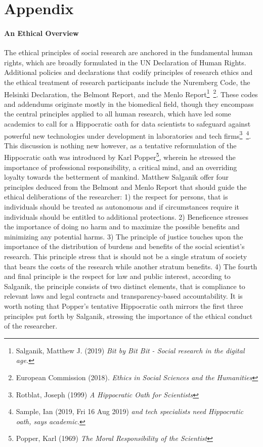 \documentclass[12pt,a4paper]{article}
\begin{document}
\section{Appendix}
\paragraph{An Ethical Overview \newline}
The ethical principles of social research are anchored in the fundamental human rights, which are broadly formulated in the UN Declaration of Human Rights. Additional policies and declarations that codify principles of research ethics and the ethical treatment of research participants include the Nuremberg Code, the Helsinki Declaration, the Belmont Report, and the Menlo Report\footnote{Salganik, Matthew J. (2019) \textit{Bit by Bit Bit - Social research in the digital age.}}\, \footnote{European Commission (2018). \textit{Ethics in Social Sciences and the Humanities}}. These codes and addendums originate mostly in the biomedical field, though they encompass the central principles applied to all human research, which have led some academics to call for a Hippocratic oath for data scientists to safeguard against powerful new technologies under development in laboratories and tech firms\footnote{Rotblat, Joseph (1999) \textit{A Hippocratic Oath for Scientists}}\, \footnote{Sample, Ian (2019, Fri 16 Aug 2019) \textit{and tech specialists need Hippocratic oath, says academic.}}. This discussion is nothing new however, as a tentative reformulation of the Hippocratic oath was introduced by Karl Popper\footnote{Popper, Karl (1969) \textit{The Moral Responsibility of the Scientist}}, wherein he stressed the importance of professional responsibility, a critical mind, and an overriding loyalty towards the betterment of mankind.\newline
Matthew Salganik offer four principles deduced from the Belmont and Menlo Report that should guide the ethical deliberations of the researcher: 1) the respect for persons, that is individuals should be treated as autonomous and if circumstances require it individuals should be entitled to additional protections. 2) Beneficence stresses the importance of doing no harm and to maximize the possible benefits and minimizing any potential harms. 3) The principle of justice touches upon the importance of the distribution of burdens and benefits of the social scientist's research. This principle stress that is should not be a single stratum of society that bears the costs of the research while another stratum benefits. 4) The fourth and final principle is the respect for law and public interest, according to Salganik, the principle consists of two distinct elements, that is compliance to relevant laws and legal contracts and transparency-based accountability. It is worth noting that Popper’s tentative Hippocratic oath mirrors the first three principles put forth by Salganik, stressing the importance of the ethical conduct of the researcher.\newline
\end{document}
